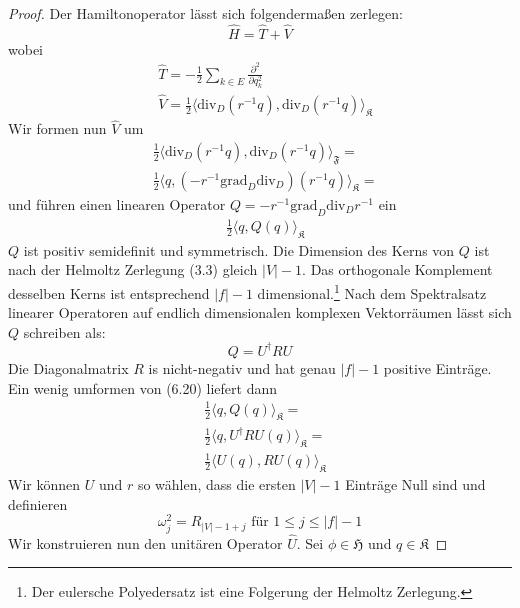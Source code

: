 \documentclass[11pt,a4paper,leqno]{report}
\numberwithin{equation}{chapter}
\begin{document}
\begin{proof}
	Der Hamiltonoperator l\"asst sich folgenderma\ss{}en zerlegen:
	\begin{equation*}
		\hat{H} = \hat{T} + \hat{V}
	\end{equation*}
	wobei
	\begin{align*}
		&\hat{T} = -\frac{1}{2}\sum_{k\in E}\frac{\partial^2}{\partial q_k^2}\\
	    &\hat{V} = \frac{1}{2}\langle \text{div}_D(r^{-1}q), \text{div}_D(r^{-1}q)\rangle_{\mathfrak{K}}
	\end{align*}
	Wir formen nun $\hat{V}$ um
	\begin{align*}
		&\frac{1}{2}\langle \text{div}_D(r^{-1}q), \text{div}_D(r^{-1}q)\rangle_{\mathfrak{F}}=\\
		&\frac{1}{2}\langle q, (-r^{-1}\text{grad}_D\text{div}_D)(r^{-1}q)\rangle_{\mathfrak{K}}=
	\end{align*}
	und f\"uhren einen linearen Operator $Q=-r^{-1}\text{grad}_D\text{div}_Dr^{-1}$ ein
	\begin{align}
		&\frac{1}{2}\langle q, Q(q)\rangle_{\mathfrak{K}}
	\end{align}
	$Q$ ist positiv semidefinit und symmetrisch. Die Dimension des Kerns von $Q$ ist nach der Helmoltz Zerlegung (3.3) gleich $|V| - 1$. Das orthogonale Komplement desselben Kerns ist entsprechend $|f| - 1$ dimensional.\footnote{Der eulersche Polyedersatz ist eine Folgerung der Helmoltz Zerlegung.}
	Nach dem Spektralsatz linearer Operatoren auf endlich dimensionalen komplexen Vektorr\"aumen l\"asst sich $Q$ schreiben als:
	\begin{equation*}
		Q = U^\dagger R U
	\end{equation*}
	Die Diagonalmatrix $R$ is nicht-negativ und hat genau $|f| - 1$ positive Eintr\"age.\\
	Ein wenig umformen von (6.20) liefert dann
	\begin{align*}
		&\frac{1}{2}\langle q, Q(q)\rangle_{\mathfrak{K}}=\\
		&\frac{1}{2}\langle q, U^\dagger R U(q)\rangle_{\mathfrak{K}}=\\
		&\frac{1}{2}\langle U(q), R U(q)\rangle_{\mathfrak{K}}
	\end{align*}
	Wir k\"onnen $U$ und $r$ so w\"ahlen, dass die ersten $|V|-1$ Eintr\"age Null sind und definieren 
	\begin{equation*}
		\omega_j^2 = R_{|V|-1 + j} \text{ f\"ur }1\leq j \leq |f| - 1
	\end{equation*}
	Wir konstruieren nun den unit\"aren Operator $\hat{U}$. Sei $\phi\in\mathfrak{H}$ und $q\in\mathfrak{K}$

\end{proof}
\end{document}
